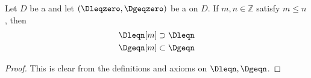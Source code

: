 \begin{lemma} \label{lemma:shifts_of_t_structure_on_a_triangulated_category_are_contained_in_one_another}
    Let $D$ be a  and let $(\Dleqzero, \Dgeqzero)$ be a  on $D$.
    If $m,n \in \mathbb{Z}$ satisfy $m \leq n$, then 
    \begin{align*}
        \Dleqn[m] &\supset \Dleqn \\
        \Dgeqn[m] &\subset \Dgeqn
    \end{align*}
\end{lemma}
\begin{proof}
    This is clear from the definitions and axioms on $\Dleqn, \Dgeqn$. 
\end{proof}